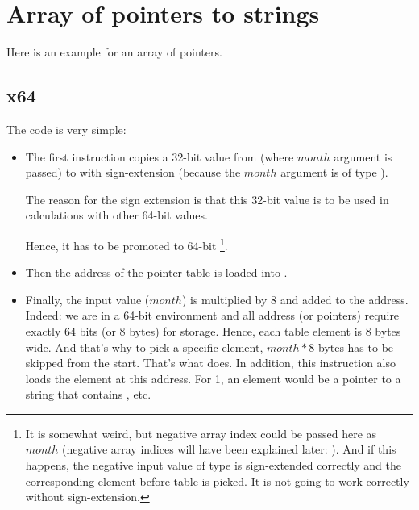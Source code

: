 ﻿\section{Array of pointers to strings}
\label{array_of_pointers_to_strings}

Here is an example for an array of pointers.



\subsection{x64}



The code is very simple:

\begin{itemize}

\item
{}

The first  instruction copies a 32-bit value from \ECX (where $month$ argument is passed) 
to \RAX with sign-extension (because the $month$ argument is of type \Tint).

The reason for the sign extension is that this 32-bit value is to be used in calculations
with other 64-bit values.

Hence, it has to be promoted to 64-bit%
\footnote{It is somewhat weird, but negative array index could be passed here as $month$
(negative array indices will have been explained later: ).
And if this happens, the negative input value of \Tint type is sign-extended correctly 
and the corresponding element before table is picked. 
It is not going to work correctly without sign-extension.}.

\item
Then the address of the pointer table is loaded into \RCX.

\item
Finally, the input value ($month$) is multiplied by 8 and added to the address.
Indeed: we are in a 64-bit environment and all address (or pointers) require exactly 64 bits (or 8 bytes) 
for storage.
Hence, each table element is 8 bytes wide.
And that's why to pick a specific element, $month*8$ bytes has to be skipped from the start.
That's what \MOV does.
In addition, this instruction also loads the element at this address.
For 1, an element would be a pointer to a string that contains , etc.

\end{itemize}

